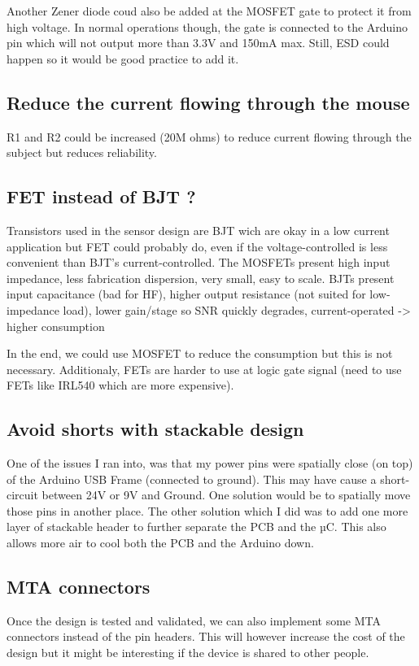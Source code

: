 \documentclass[a4paper]{article}
\begin{document}
Another Zener diode coud also be added at the MOSFET gate to protect it from high voltage. In normal operations though, the gate is connected to the Arduino pin which will not output more than 3.3V and 150mA max. Still, ESD could happen so it would be good practice to add it.

\subsection{Reduce the current flowing through the mouse}
R1 and R2 could be increased (20M ohms) to reduce current flowing through the subject but reduces reliability.

\subsection{FET instead of BJT ?}
Transistors used in the sensor design are BJT wich are okay in a low current application but FET could probably do, even if the voltage-controlled is less convenient than BJT's current-controlled.
The MOSFETs present high input impedance, less fabrication dispersion, very small, easy to scale.
BJTs present input capacitance (bad for HF), higher output resistance (not suited for low-impedance load), lower gain/stage so SNR quickly degrades, current-operated -> higher consumption

In the end, we could use MOSFET to reduce the consumption but this is not necessary.
Additionaly, FETs are harder to use at logic gate signal (need to use FETs like IRL540 which are more expensive).

\subsection{Avoid shorts with stackable design}
One of the issues I ran into, was that my power pins were spatially close (on top) of the Arduino USB Frame (connected to ground). This may have cause a short-circuit between 24V or 9V and Ground. One solution would be to spatially move those pins in another place.
The other solution which I did was to add one more layer of stackable header to further separate the PCB and the µC. This also allows more air to cool both the PCB and the Arduino down.

\subsection{MTA connectors}
Once the design is tested and validated, we can also implement some MTA connectors instead of the pin headers. This will however increase the cost of the design but it might be interesting if the device is shared to other people.
\end{document}
